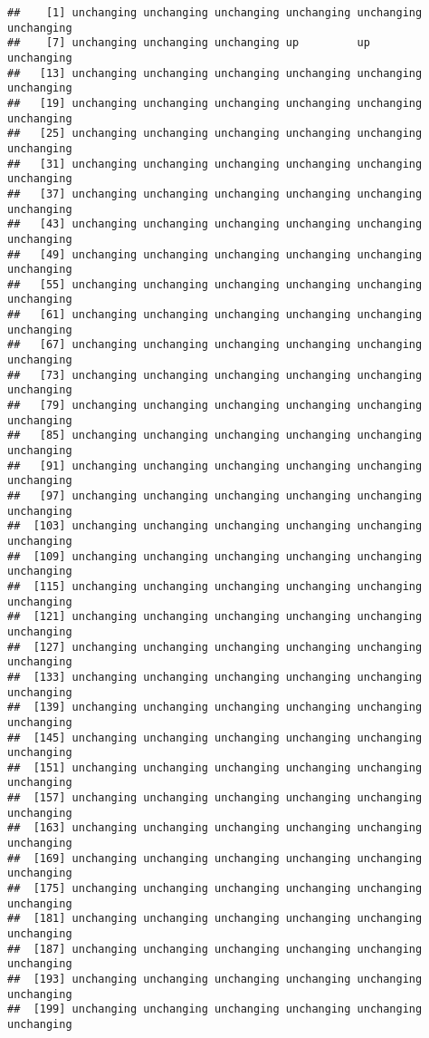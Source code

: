 \documentclass[]{article}
\begin{document}
\begin{verbatim}
##    [1] unchanging unchanging unchanging unchanging unchanging unchanging
##    [7] unchanging unchanging unchanging up         up         unchanging
##   [13] unchanging unchanging unchanging unchanging unchanging unchanging
##   [19] unchanging unchanging unchanging unchanging unchanging unchanging
##   [25] unchanging unchanging unchanging unchanging unchanging unchanging
##   [31] unchanging unchanging unchanging unchanging unchanging unchanging
##   [37] unchanging unchanging unchanging unchanging unchanging unchanging
##   [43] unchanging unchanging unchanging unchanging unchanging unchanging
##   [49] unchanging unchanging unchanging unchanging unchanging unchanging
##   [55] unchanging unchanging unchanging unchanging unchanging unchanging
##   [61] unchanging unchanging unchanging unchanging unchanging unchanging
##   [67] unchanging unchanging unchanging unchanging unchanging unchanging
##   [73] unchanging unchanging unchanging unchanging unchanging unchanging
##   [79] unchanging unchanging unchanging unchanging unchanging unchanging
##   [85] unchanging unchanging unchanging unchanging unchanging unchanging
##   [91] unchanging unchanging unchanging unchanging unchanging unchanging
##   [97] unchanging unchanging unchanging unchanging unchanging unchanging
##  [103] unchanging unchanging unchanging unchanging unchanging unchanging
##  [109] unchanging unchanging unchanging unchanging unchanging unchanging
##  [115] unchanging unchanging unchanging unchanging unchanging unchanging
##  [121] unchanging unchanging unchanging unchanging unchanging unchanging
##  [127] unchanging unchanging unchanging unchanging unchanging unchanging
##  [133] unchanging unchanging unchanging unchanging unchanging unchanging
##  [139] unchanging unchanging unchanging unchanging unchanging unchanging
##  [145] unchanging unchanging unchanging unchanging unchanging unchanging
##  [151] unchanging unchanging unchanging unchanging unchanging unchanging
##  [157] unchanging unchanging unchanging unchanging unchanging unchanging
##  [163] unchanging unchanging unchanging unchanging unchanging unchanging
##  [169] unchanging unchanging unchanging unchanging unchanging unchanging
##  [175] unchanging unchanging unchanging unchanging unchanging unchanging
##  [181] unchanging unchanging unchanging unchanging unchanging unchanging
##  [187] unchanging unchanging unchanging unchanging unchanging unchanging
##  [193] unchanging unchanging unchanging unchanging unchanging unchanging
##  [199] unchanging unchanging unchanging unchanging unchanging unchanging

\end{verbatim}
\end{document}
